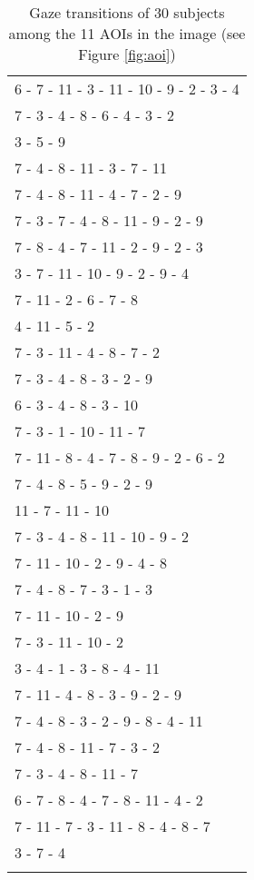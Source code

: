 \begin{table}[H]
  \small
  \begin{tabular}{l}
    6 - 7 - 11 - 3 - 11 - 10 - 9 - 2 - 3 - 4\\
    7 - 3 - 4 - 8 - 6 - 4 - 3 - 2\\
    3 - 5 - 9\\
    7 - 4 - 8 - 11 - 3 - 7 - 11\\
    7 - 4 - 8 - 11 - 4 - 7 - 2 - 9\\
    7 - 3 - 7 - 4 - 8 - 11 - 9 - 2 - 9\\
    7 - 8 - 4 - 7 - 11 - 2 - 9 - 2 - 3\\
    3 - 7 - 11 - 10 - 9 - 2 - 9 - 4\\
    7 - 11 - 2 - 6 - 7 - 8\\
    4 - 11 - 5 - 2\\
    7 - 3 - 11 - 4 - 8 - 7 - 2\\
    7 - 3 - 4 - 8 - 3 - 2 - 9\\
    6 - 3 - 4 - 8 - 3 - 10\\
    7 - 3 - 1 - 10 - 11 - 7\\
    7 - 11 - 8 - 4 - 7 - 8 - 9 - 2 - 6 - 2\\
    7 - 4 - 8 - 5 - 9 - 2 - 9\\
    11 - 7 - 11 - 10\\
    7 - 3 - 4 - 8 - 11 - 10 - 9 - 2\\
    7 - 11 - 10 - 2 - 9 - 4 - 8\\
    7 - 4 - 8 - 7 - 3 - 1 - 3\\
    7 - 11 - 10 - 2 - 9\\
    7 - 3 - 11 - 10 - 2\\
    3 - 4 - 1 - 3 - 8 - 4 - 11\\
    7 - 11 - 4 - 8 - 3 - 9 - 2 - 9\\
    7 - 4 - 8 - 3 - 2 - 9 - 8 - 4 - 11\\
    7 - 4 - 8 - 11 - 7 - 3 - 2 \\
    7 - 3 - 4 - 8 - 11 - 7\\
    6 - 7 - 8 - 4 - 7 - 8 - 11 - 4 - 2\\
    7 - 11 - 7 - 3 - 11 - 8 - 4 - 8 - 7\\
    3 - 7 - 4\\
    \\
  \end{tabular}
  \caption{Gaze transitions of 30 subjects among the 11 AOIs in the image (see Figure \ref{fig:aoi})}
  \label{tab:seq}
\end{table}

